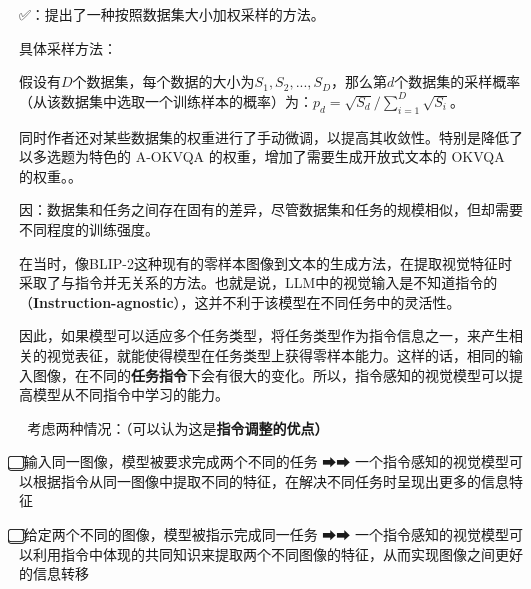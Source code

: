 \documentclass[zihao=false,fontset=windows]{ctexart}
\newcommand{\feiEmoji}[1]{{\emojifont #1}}
\begin{document}
\feiEmoji{✅}：提出了一种按照数据集大小加权采样的方法。\par

具体采样方法：\par

假设有$D$个数据集，每个数据的大小为$S_1,S_2,...,S_D$，那么第$d$个数据集的采样概率（从该数据集中选取一个训练样本的概率）为：$p_d=\sqrt{S_d}/\displaystyle\sum_{i=1}^{D}\sqrt{S_i}$。\par

同时作者还对某些数据集的权重进行了手动微调，以提高其收敛性。特别是降低了以多选题为特色的 A-OKVQA 的权重，增加了需要生成开放式文本的 OKVQA 的权重。。\par

\begin{feishuquote}
因：数据集和任务之间存在固有的差异，尽管数据集和任务的规模相似，但却需要不同程度的训练强度。\par

\end{feishuquote}


\par\vspace{0.95em}\par\vspace{0.28em}
在当时，像BLIP-2这种现有的零样本图像到文本的生成方法，在提取视觉特征时采取了与指令并无关系的方法。也就是说，LLM中的视觉输入是不知道指令的（\textbf{Instruction-agnostic}），这并不利于该模型在不同任务中的灵活性。\par

因此，如果模型可以适应多个任务类型，将任务类型作为指令信息之一，来产生相关的视觉表征，就能使得模型在任务类型上获得零样本能力。这样的话，相同的输入图像，在不同的\textbf{任务指令}下会有很大的变化。所以，\textcolor{feishuRed}{指令感知的视觉模型可以提高模型从不同指令中学习的能力。}\par

\feiEmoji{🌰} 考虑两种情况：（可以认为这是\textbf{指令调整的优点}\textbf{）}\par

\feiEmoji{1⃣} 输入同一图像，模型被要求完成两个不同的任务 \feiEmoji{➡}\feiEmoji{➡}\textcolor{sourceGreenText}{ 一个指令感知的视觉模型可以根据指令从同一图像中提取不同的特征，在解决不同任务时呈现出更多的信息特征}\par

\feiEmoji{2⃣} 给定两个不同的图像，模型被指示完成同一任务 \feiEmoji{➡}\feiEmoji{➡} \textcolor{sourceGreenText}{一个指令感知的视觉模型可以利用指令中体现的共同知识来提取两个不同图像的特征，从而实现图像之间更好的信息转移}\par
\end{document}
